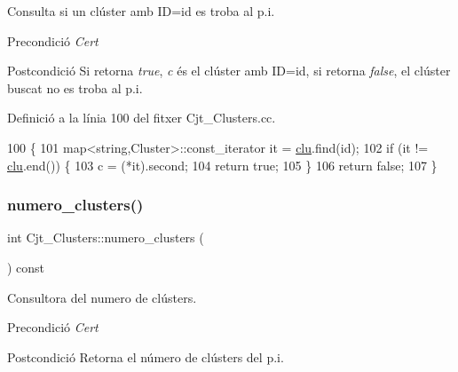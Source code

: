 Consulta si un clúster amb ID=id es troba al p.\+i. 

\begin{DoxyPrecond}{Precondició}
{\itshape Cert} 
\end{DoxyPrecond}
\begin{DoxyPostcond}{Postcondició}
Si retorna {\itshape true}, {\itshape c} és el clúster amb ID=id, si retorna {\itshape false}, el clúster buscat no es troba al p.\+i. 
\end{DoxyPostcond}


Definició a la línia 100 del fitxer Cjt\+\_\+\+Clusters.\+cc.


\begin{DoxyCode}
100                                                                 \{
101     map<string,Cluster>::const\_iterator it = \hyperlink{class_cjt___clusters_a86fd6089c4e49eaedea86d5ec4ee6495}{clu}.find(\textcolor{keywordtype}{id});
102     \textcolor{keywordflow}{if} (it != \hyperlink{class_cjt___clusters_a86fd6089c4e49eaedea86d5ec4ee6495}{clu}.end()) \{
103         c = (*it).second;
104         \textcolor{keywordflow}{return} \textcolor{keyword}{true};
105     \}
106     \textcolor{keywordflow}{return} \textcolor{keyword}{false};
107 \}
\end{DoxyCode}
\mbox{\label{class_cjt___clusters_ac8f1dc8aefd1619f4a78c04624dedcc0}} 
\subsubsection{\texorpdfstring{numero\+\_\+clusters()}{numero\_clusters()}}
{\footnotesize\ttfamily int Cjt\+\_\+\+Clusters\+::numero\+\_\+clusters (\begin{DoxyParamCaption}{ }\end{DoxyParamCaption}) const}



Consultora del numero de clústers. 

\begin{DoxyPrecond}{Precondició}
{\itshape Cert} 
\end{DoxyPrecond}
\begin{DoxyPostcond}{Postcondició}
Retorna el número de clústers del p.\+i. 
\end{DoxyPostcond}



